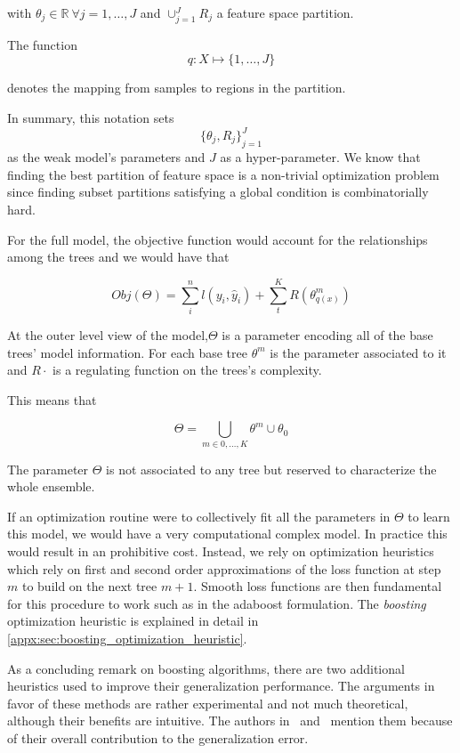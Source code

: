 with $\theta_j \in \mathbb{R} \ \forall j = 1,\ldots,J$ and $ \cup_{j=1}^J R_j$ a feature space partition.

The function
\begin{equation}
q : X \mapsto \{1,\ldots,J\}
\end{equation}

denotes the mapping from samples to regions in the partition.

In summary, this notation sets
$${\{\theta_j, R_j\}}_{j=1}^J$$
as the weak model's parameters and $J$ as a hyper-parameter.
We know that finding the best partition of feature space is a non-trivial optimization problem since finding subset partitions satisfying a global condition is combinatorially hard.

For the full model, the objective function would account for the relationships among the trees and we would have that

\begin{equation}\label{eq:boosting-objfunction}
Obj(\Theta) = \sum_i^n l(y_i,\hat{y}_i) + \sum_t^K R(\theta^m_{q(x)})
\end{equation}

At the outer level view of the model,$\Theta$ is a parameter encoding all of the base trees' model information.
For each base tree $\theta^m$ is the parameter associated to it and $R{\cdot}$ is a regulating function on the trees's complexity.

This means that

$$\Theta = \bigcup_{m \in {0,\ldots,K}} \theta^m \cup \theta_0$$

The parameter $\Theta$ is not associated to any tree but reserved to characterize the whole ensemble.

If an optimization routine were to collectively fit all the parameters in $\Theta$ to learn this model, we would have a very computational complex model.
In practice this would result in an prohibitive cost.
Instead, we rely on optimization heuristics which rely on first and second order approximations of the loss function at step $m$ to build on the next tree $m+1$.
Smooth loss functions are then fundamental for this procedure to work such as in the adaboost formulation.
The \textit{boosting} optimization heuristic is explained in detail in \cref{appx:sec:boosting_optimization_heuristic}.


As a concluding remark on boosting algorithms, there are two additional heuristics used to improve their generalization performance.
The arguments in favor of these methods are rather experimental and not much theoretical, although their benefits are intuitive.
The authors in~\cite{hastie-elemstatslearn} and~\cite{bishop-patternecognition} mention them because of their overall contribution to the generalization error.

